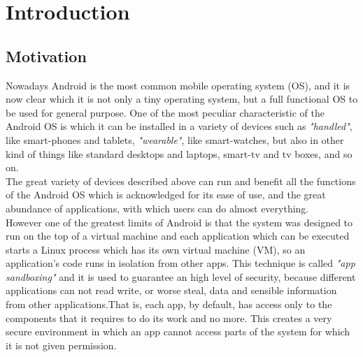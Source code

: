 %
%
\cleardoublepage
%
%
\chapter{Introduction}
%
%
\label{cap:introduction}
%
%

\section{Motivation}\label{motivation}
\par Nowadays Android is the most common mobile operating system (OS), and it is now clear which it is not only a tiny operating system, but a full functional OS to be used for general purpose. One of the most peculiar characteristic of the Android OS is which it can be installed in a variety of devices such as \textit{"handled"}, like smart-phones and tablets, \textit{"wearable"}, like smart-watches, but also in other kind of things like standard desktops and laptops, smart-tv and tv boxes, and so on.\\
The great variety of devices described above can run and benefit all the functions of the Android OS which is acknowledged for its ease of use, and the great abundance of applications, with which users can do almost everything. \\
However one of the greatest limits of Android is that the system was designed to run on the top of a virtual machine and each  application which can be executed starts a Linux process which has its own virtual machine (VM), so an application's code runs in isolation from other apps. This technique is called \textit{"app sandboxing"} and it is used to guarantee an high level of security, because different applications can not read write, or worse steal, data and sensible information from other applications.That is, each app, by default, has access only to the components that it requires to do its work and no more. This creates a very secure environment in which an app cannot access parts of the system for which it is not given permission.\\
